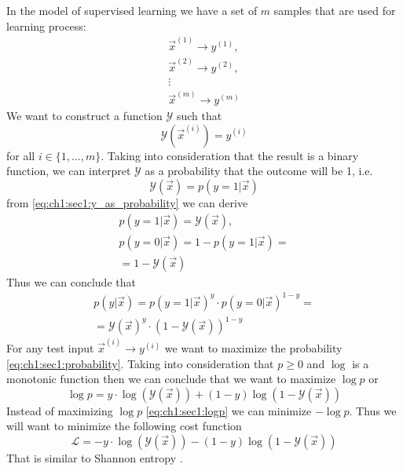 In the model of supervised learning we have a set of $m$ samples that are used
for learning process:
\[
\begin{array}{c}
  \vec{x}^{(1)} \rightarrow y^{(1)}, \\
  \vec{x}^{(2)} \rightarrow y^{(2)}, \\
  \vdots \\
  \vec{x}^{(m)} \rightarrow y^{(m)}
\end{array}
\]
We want to construct a function $\mathcal{Y}$ such that
\[
\mathcal{Y}\left(\vec{x}^{(i)}\right) = y^{(i)}
\]
for all $i \in \{1, \dots, m\}$. Taking into consideration that the result is a
binary function, we can interpret $\mathcal{Y}$ as a probability that the
outcome will be 1, i.e.
\begin{equation}
  \mathcal{Y}\left(\vec{x}\right) = p\left(\left. y = 1\right|\vec{x}\right)
  \label{eq:ch1:sec1:y_as_probability}
\end{equation}
from \cref{eq:ch1:sec1:y_as_probability} we can derive
\begin{align}
  p\left(\left. y = 1\right|\vec{x}\right) = \mathcal{Y}\left(\vec{x}\right),
  \nonumber \\
  p\left(\left. y = 0\right|\vec{x}\right) = 1 - p\left(\left. y =
  1\right|\vec{x}\right) =
  \nonumber \\
  = 1 - \mathcal{Y}\left(\vec{x}\right)
  \nonumber
\end{align}
Thus we can conclude that
\begin{align}
  p\left(\left. y\right|\vec{x}\right) =
  p\left(\left. y = 1\right|\vec{x}\right)^y \cdot
  p\left(\left. y = 0\right|\vec{x}\right)^{1-y} =
  \nonumber \\
  = \mathcal{Y}\left(\vec{x}\right)^y \cdot
  \left(1 - \mathcal{Y}\left(\vec{x}\right)\right)^{1 - y}
\label{eq:ch1:sec1:probability}
\end{align}
For any test input $\vec{x}^{(i)} \rightarrow y^{(i)}$ we want to maximize the
probability \cref{eq:ch1:sec1:probability}. Taking into consideration that
$p \ge 0$ and $\log$ is a monotonic function \cite{wiki:monotonic_func} then we
can conclude that we want 
to maximize $\log p$ or
\begin{equation}
\log p = y \cdot \log\left(\mathcal{Y}\left(\vec{x}\right)\right) +
(1-y) \log\left(1 - \mathcal{Y}\left(\vec{x}\right)\right)
\label{eq:ch1:sec1:logp}
\end{equation}
Instead of maximizing $\log p$ \cref{eq:ch1:sec1:logp} we can minimize $- \log
p$. Thus we will want to 
minimize the following cost function
\begin{equation}
  \mathcal{L} = - y \cdot \log \left(\mathcal{Y}\left(\vec{x}\right)\right) -
(1-y) \log\left(1 - \mathcal{Y}\left(\vec{x}\right)\right)
  \label{eq:ch1:sec1:cost_func}
\end{equation}
That is similar to Shannon entropy \cite{wiki:entropy_information}.

